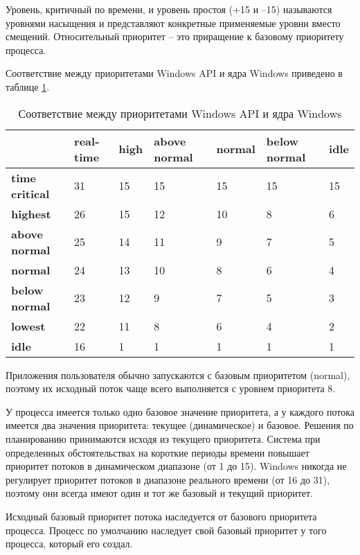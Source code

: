 Уровень, критичный по времени, и уровень простоя (+15 и –15) называются уровнями насыщения и представляют конкретные применяемые уровни вместо смещений. Относительный приоритет -- это приращение к базовому приоритету процесса.
 

Соответствие между приоритетами Windows API и ядра Windows приведено в таблице \ref{tbl:priority}.
\begin{table}[h]
	\caption{Соответствие между приоритетами Windows API и ядра Windows}
	\begin{center}
		\begin{tabular}{|l|p{45pt}|p{45pt}|p{45pt}|p{45pt}|p{45pt}|p{45pt}|} 
			\hline
			{} & \textbf{real-time} & \textbf{high} & \textbf{above normal} & \textbf{normal} & \textbf{below normal} & \textbf{idle}\\
			\hline
			\textbf{time critical} & 31 & 15 & 15 & 15 & 15 & 15 \\
			\hline
			\textbf{highest} & 26 & 15 & 12 & 10 & 8 & 6 \\
			\hline
			\textbf{above normal} & 25 & 14 & 11 & 9 & 7 & 5 \\
			\hline
			\textbf{normal} & 24 & 13 & 10 & 8 & 6 & 4 \\
			\hline
			\textbf{below normal} & 23 & 12 & 9 & 7 & 5 & 3 \\
			\hline
			\textbf{lowest} & 22 & 11 & 8 & 6 & 4 & 2 \\
			\hline
			\textbf{idle} & 16 & 1 & 1 & 1 & 1 & 1 \\
			\hline
		\end{tabular}
	\end{center}
	\label{tbl:priority}
\end{table}

Приложения пользователя обычно запускаются с базовым приоритетом (normal), поэтому их исходный поток чаще всего выполняется с уровнем приоритета 8. 

У процесса имеется только одно базовое значение приоритета, а у каждого потока имеется два значения приоритета: текущее (динамическое) и базовое. Решения по планированию принимаются исходя из текущего приоритета. Система при определенных обстоятельствах на короткие периоды времени повышает приоритет потоков в динамическом диапазоне (от 1 до 15). Windows никогда не регулирует приоритет потоков в диапазоне реального времени (от 16 до 31), поэтому они всегда имеют один и тот же базовый и текущий приоритет.

Исходный базовый приоритет потока наследуется от базового приоритета процесса. Процесс по умолчанию наследует свой базовый приоритет у того процесса, который его создал.

